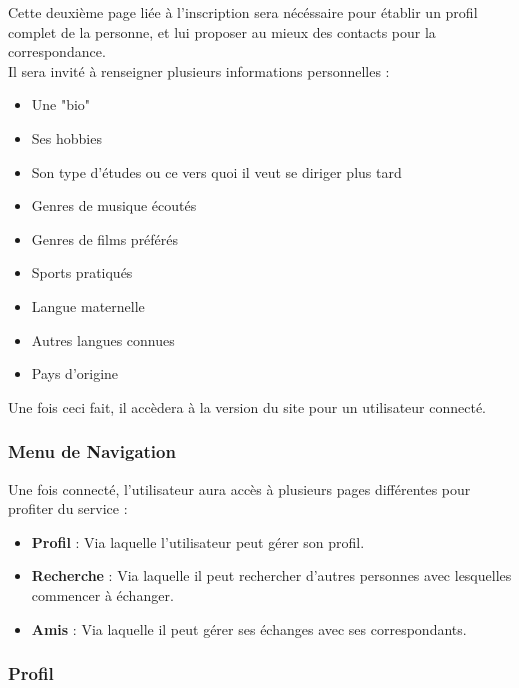 \documentclass{report}
\begin{document}
			Cette deuxième page liée à l'inscription sera nécéssaire pour établir un profil complet de la personne, et lui proposer au mieux des contacts pour la correspondance.\\
			Il sera invité à renseigner plusieurs informations personnelles : \\

			\begin{itemize}
				\item Une "bio"
				\item Ses hobbies
				\item Son type d'études ou ce vers quoi il veut se diriger plus tard
				\item Genres de musique écoutés
				\item Genres de films préférés
				\item Sports pratiqués
				\item Langue maternelle
				\item Autres langues connues
				\item Pays d'origine\\
			\end{itemize}

			Une fois ceci fait, il accèdera à la version du site pour un utilisateur connecté.\\

		\subsubsection{Menu de Navigation}

			Une fois connecté, l'utilisateur aura accès à plusieurs pages différentes pour profiter du service : \\

			\begin{itemize}
				\item \textbf{Profil} : Via laquelle l'utilisateur peut gérer son profil.

				\item \textbf{Recherche} : Via laquelle il peut rechercher d'autres personnes avec lesquelles commencer à échanger.

				\item \textbf{Amis} : Via laquelle il peut gérer ses échanges avec ses correspondants.
			\end{itemize}

		\subsubsection{Profil}
\end{document}
